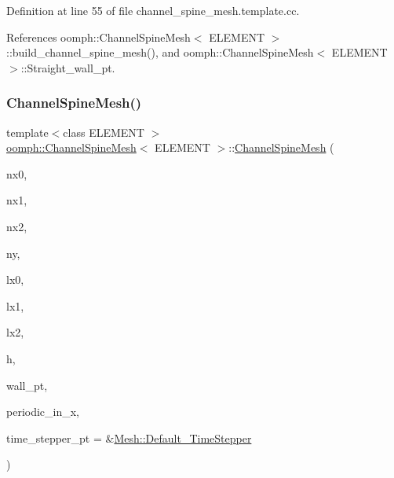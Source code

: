 Definition at line 55 of file channel\+\_\+spine\+\_\+mesh.\+template.\+cc.



References oomph\+::\+Channel\+Spine\+Mesh$<$ E\+L\+E\+M\+E\+N\+T $>$\+::build\+\_\+channel\+\_\+spine\+\_\+mesh(), and oomph\+::\+Channel\+Spine\+Mesh$<$ E\+L\+E\+M\+E\+N\+T $>$\+::\+Straight\+\_\+wall\+\_\+pt.

\mbox{\label{classoomph_1_1ChannelSpineMesh_afb1b729691c03cef065d351094092406}} 
\subsubsection{\texorpdfstring{Channel\+Spine\+Mesh()}{ChannelSpineMesh()}\hspace{0.1cm}{\footnotesize\ttfamily [2/2]}}
{\footnotesize\ttfamily template$<$class E\+L\+E\+M\+E\+NT $>$ \\
\hyperlink{classoomph_1_1ChannelSpineMesh}{oomph\+::\+Channel\+Spine\+Mesh}$<$ E\+L\+E\+M\+E\+NT $>$\+::\hyperlink{classoomph_1_1ChannelSpineMesh}{Channel\+Spine\+Mesh} (\begin{DoxyParamCaption}\item[{const unsigned \&}]{nx0,  }\item[{const unsigned \&}]{nx1,  }\item[{const unsigned \&}]{nx2,  }\item[{const unsigned \&}]{ny,  }\item[{const double \&}]{lx0,  }\item[{const double \&}]{lx1,  }\item[{const double \&}]{lx2,  }\item[{const double \&}]{h,  }\item[{\hyperlink{classoomph_1_1GeomObject}{Geom\+Object} $\ast$}]{wall\+\_\+pt,  }\item[{const bool \&}]{periodic\+\_\+in\+\_\+x,  }\item[{\hyperlink{classoomph_1_1TimeStepper}{Time\+Stepper} $\ast$}]{time\+\_\+stepper\+\_\+pt = {\ttfamily \&\hyperlink{classoomph_1_1Mesh_a12243d0fee2b1fcee729ee5a4777ea10}{Mesh\+::\+Default\+\_\+\+Time\+Stepper}} }\end{DoxyParamCaption})}



